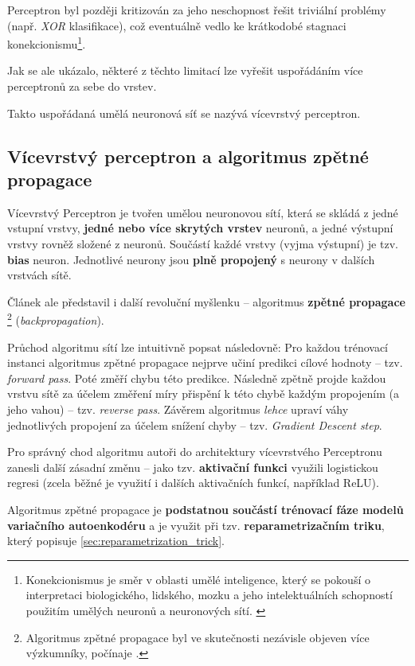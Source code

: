 Perceptron byl později kritizován \cite{Minsky1969} za jeho neschopnost řešit triviální problémy (např. \emph{XOR} klasifikace), což eventuálně vedlo ke krátkodobé stagnaci konekcionismu\footnote{Konekcionismus je směr v oblasti umělé inteligence, který se pokouší o interpretaci biologického, lidského, mozku a jeho intelektuálních schopností použitím umělých neuronů a neuronových sítí. \cite{Rumelhart1986}}. \cite{Goodfellow2016}

Jak se ale ukázalo, některé z těchto limitací lze vyřešit uspořádáním více perceptronů za sebe do vrstev. \cite{Rumelhart1987}

Takto uspořádaná umělá neuronová síť se nazývá vícevrstvý perceptron.


\subsection{Vícevrstvý perceptron a algoritmus zpětné propagace}
\label{sec:multilayer_perceptron}
Vícevrstvý Perceptron je tvořen umělou neuronovou sítí, která se skládá z jedné vstupní vrstvy, \textbf{jedné nebo více skrytých vrstev} neuronů, a jedné výstupní vrstvy rovněž složené z neuronů.
Součástí každé vrstvy (vyjma výstupní) je tzv. \textbf{bias} neuron. Jednotlivé neurony jsou \textbf{plně propojený} s neurony v dalších vrstvách sítě. \cite{Geron2019}

Článek \cite{Rumelhart1987} ale představil i další revoluční myšlenku – algoritmus \textbf{zpětné propagace}
\footnote{Algoritmus zpětné propagace byl ve skutečnosti nezávisle objeven více výzkumníky, počínaje \cite{Bryson1969}.} (\emph{backpropagation}).

Průchod algoritmu sítí lze intuitivně popsat následovně: Pro každou trénovací instanci algoritmus zpětné propagace nejprve učiní predikci cílové hodnoty – tzv. \emph{forward pass}.
Poté změří chybu této predikce. Následně zpětně projde každou vrstvu sítě za účelem změření míry přispění k této chybě každým propojením (a jeho vahou) – tzv. \emph{reverse pass}.
Závěrem algoritmus \emph{lehce} upraví váhy jednotlivých propojení za účelem snížení chyby – tzv. \emph{Gradient Descent step}. \cite{Geron2019}

Pro správný chod algoritmu autoři \cite{Rumelhart1987} do architektury vícevrstvého Perceptronu zanesli další zásadní změnu – jako tzv. \textbf{aktivační funkci} využili logistickou regresi (zcela běžné je využití i dalších aktivačních funkcí, například ReLU).

Algoritmus zpětné propagace je \textbf{podstatnou součástí trénovací fáze modelů variačního autoenkodéru} a je využit při tzv. \textbf{reparametrizačním triku}, který popisuje \autoref{sec:reparametrization_trick}.

